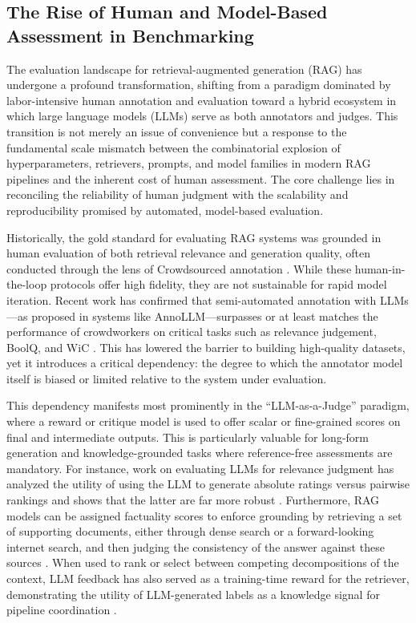 \documentclass[11pt,a4paper]{article}
\begin{document}
\subsection{The Rise of Human and Model-Based Assessment in Benchmarking}


The evaluation landscape for retrieval-augmented generation (RAG) has undergone a profound transformation, shifting from a paradigm dominated by labor-intensive human annotation and evaluation toward a hybrid ecosystem in which large language models (LLMs) serve as both annotators and judges. This transition is not merely an issue of convenience but a response to the fundamental scale mismatch between the combinatorial explosion of hyperparameters, retrievers, prompts, and model families in modern RAG pipelines and the inherent cost of human assessment. The core challenge lies in reconciling the reliability of human judgment with the scalability and reproducibility promised by automated, model-based evaluation.

Historically, the gold standard for evaluating RAG systems was grounded in human evaluation of both retrieval relevance and generation quality, often conducted through the lens of Crowdsourced annotation \cite{arxiv:2303.16854v2}. While these human-in-the-loop protocols offer high fidelity, they are not sustainable for rapid model iteration. Recent work has confirmed that semi-automated annotation with LLMs---as proposed in systems like AnnoLLM---surpasses or at least matches the performance of crowdworkers on critical tasks such as relevance judgement, BoolQ, and WiC \cite{arxiv:2303.16854v2,arxiv:2402.13446v1}. This has lowered the barrier to building high-quality datasets, yet it introduces a critical dependency: the degree to which the annotator model itself is biased or limited relative to the system under evaluation.

This dependency manifests most prominently in the ``LLM-as-a-Judge'' paradigm, where a reward or critique model is used to offer scalar or fine-grained scores on final and intermediate outputs. This is particularly valuable for long-form generation and knowledge-grounded tasks where reference-free assessments are mandatory. For instance, work on evaluating LLMs for relevance judgment has analyzed the utility of using the LLM to generate absolute ratings versus pairwise rankings and shows that the latter are far more robust \cite{arxiv:2304.09161v2}. Furthermore, RAG models can be assigned factuality scores to enforce grounding by retrieving a set of supporting documents, either through dense search or a forward-looking internet search, and then judging the consistency of the answer against these sources \cite{arxiv:2302.12813v3,arxiv:2311.08401v1}. When used to rank or select between competing decompositions of the context, LLM feedback has also served as a training-time reward for the retriever, demonstrating the utility of LLM-generated labels as a knowledge signal for pipeline coordination \cite{arxiv:2401.06954v2}.
\end{document}
